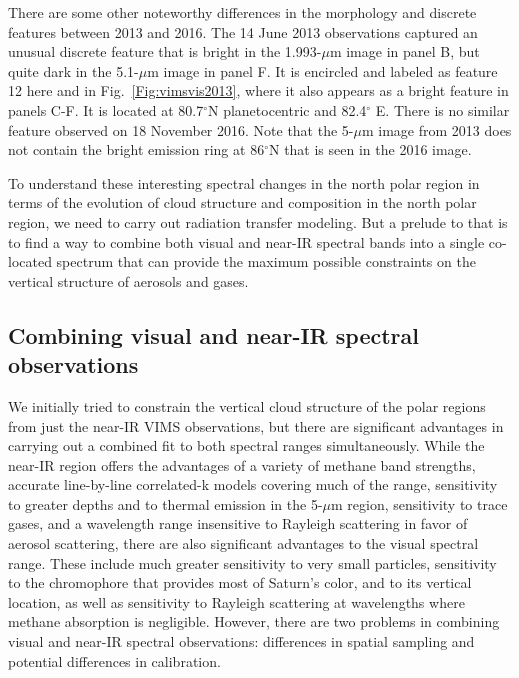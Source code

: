\documentclass[article,11pt]{emulateapj}
\def\deg{$^\circ$ }
\def\degx{$^\circ$}
\def\mum{$\mu$m }
\begin{document}
There are some other noteworthy differences in the morphology and
discrete features between 2013 and 2016. The 14 June 2013 observations
captured an unusual discrete feature that is bright in the 1.993-\mum
image in panel B, but quite dark in the 5.1-\mum image in panel F. It
is encircled and labeled as feature 12 here and in Fig.\ \ref{Fig:vimsvis2013}, where
it also appears as a bright feature in panels C-F.
It is located at 80.7\degx N planetocentric and 82.4\deg E.
 There is no similar feature observed on
18 November 2016.  Note that the 5-\mum image from 2013 does not
contain the bright emission ring at 86\degx N that is seen in the 2016
image.


To understand these interesting spectral changes in the north polar region in terms
of the evolution of cloud structure and composition in the north polar region, we need to
carry out radiation transfer modeling.  But a prelude to that is to find a way to
combine both visual and near-IR spectral bands into a single co-located spectrum
that can provide the maximum possible constraints on the vertical structure of
aerosols and gases.

\subsection{Combining visual and near-IR spectral observations}

We initially tried to constrain the vertical cloud structure of the
polar regions from just the near-IR VIMS observations, but there are
significant advantages in carrying out a combined fit to both spectral
ranges simultaneously.  While the near-IR region offers the advantages
of a variety of methane band strengths,  accurate line-by-line correlated-k
models covering much of the range, sensitivity to greater depths and to
thermal emission in the 5-\mum region, sensitivity to trace gases, and
a wavelength range insensitive to Rayleigh scattering in favor of aerosol scattering,
there are also significant advantages to the visual spectral range.
These include much greater sensitivity to very small particles, sensitivity
to the chromophore that provides most of Saturn's color, and to its
vertical location, as well as sensitivity to Rayleigh scattering at
wavelengths where methane absorption is negligible.  However, there
are two problems in combining visual and near-IR spectral observations:
differences in spatial sampling and potential differences in calibration.
\end{document}
